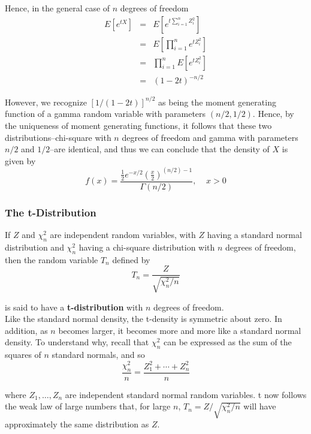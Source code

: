 \documentclass[12pt]{article}
\begin{document}
Hence, in the general case of $n$ degrees of freedom
\begin{eqnarray*}
  E[e^{tX}]
  &=& E \left[ e^{t \sum_{i=1}^n Z_i^2}  \right] \\
  &=& E \left[ \prod_{i=1}^n e^{tZ_i^2} \right] \\
  &=& \prod_{i=1}^n E \left[ e^{tZ_i^2} \right] \\
  &=& (1-2t)^{-n/2}
\end{eqnarray*}

However, we recognize $[1/(1-2t)]^{n/2}$ as being the moment generating function of a gamma random variable with parameters $(n/2, 1/2)$. Hence, by the uniqueness of moment generating functions, it follows that these two distributions--chi-square with $n$ degrees of freedom and gamma with parameters $n/2$ and $1/2$--are identical, and thus we can conclude that the density of $X$ is given by
\begin{equation*}
  f(x) = \frac{\frac{1}{2} e^{-x/2} \left( \frac{x}{2} \right)^{(n/2)-1} }
  {\Gamma \left( n/2 \right)}, \;\;\;\; x > 0
\end{equation*}

\subsubsection{The t-Distribution}

If $Z$ and $\chi_n^2$ are independent random variables, with $Z$ having a standard normal distribution and $\chi_n^2$ having a chi-square distribution with $n$ degrees of freedom, then the random variable $T_n$ defined by
\begin{equation*}
  T_n = \frac{Z}{\sqrt{\chi_n^2/n}}
\end{equation*}

is said to have a \textbf{t-distribution} with $n$ degrees of freedom. \\

Like the standard normal density, the t-density is symmetric about zero. In addition, as $n$ becomes larger, it becomes more and more like a standard normal density. To understand why, recall that $\chi_n^2$ can be expressed as the sum of the squares of $n$ standard normals, and so
\begin{equation*}
  \frac{\chi_n^2}{n} = \frac{Z_1^2 + \cdots + Z_n^2}{n}
\end{equation*}

where $Z_1, \dots, Z_n$ are independent standard normal random variables. t now follows the weak law of large numbers that, for large $n$, $T_n = Z / \sqrt{\chi_n^2 / n}$ will have approximately the same distribution as $Z$. \\
\end{document}

